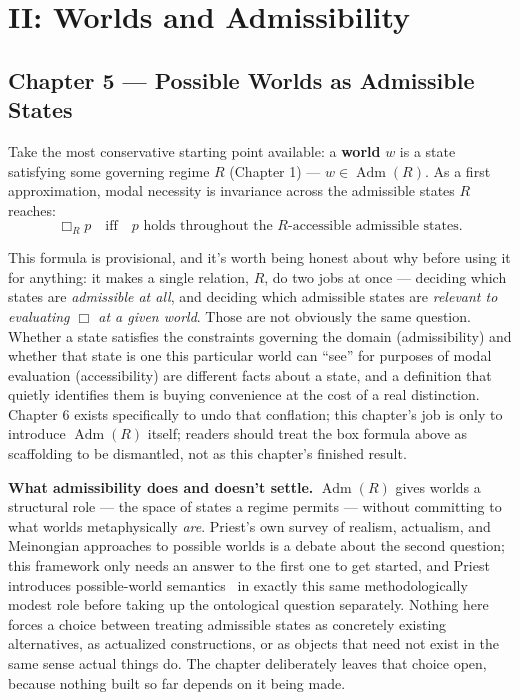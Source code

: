 \part{II: Worlds and Admissibility}\label{part-ii-worlds-and-admissibility}

\hypertarget{chapter-5-possible-worlds-as-admissible-states}{%
\chapter*{Chapter 5 --- Possible Worlds as Admissible States}
\label{chapter-5-possible-worlds-as-admissible-states}}

Take the most conservative starting point available: a \textbf{world} \(w\) is a
state satisfying some governing regime \(R\) (Chapter 1) ---
\(w \in \operatorname{Adm}(R)\). As a first approximation, modal necessity
is invariance across the admissible states \(R\) reaches:
\[\Box_R p \quad\text{iff}\quad p \text{ holds throughout the } R\text{-accessible admissible states}.\]

This formula is provisional, and it's worth being honest about why
before using it for anything: it makes a single relation, \(R\), do two
jobs at once --- deciding which states are \emph{admissible at all}, and
deciding which admissible states are \emph{relevant to evaluating \(\Box\) at a
given world}. Those are not obviously the same question. Whether a state
satisfies the constraints governing the domain (admissibility) and
whether that state is one this particular world can ``see'' for purposes
of modal evaluation (accessibility) are different facts about a state,
and a definition that quietly identifies them is buying convenience at
the cost of a real distinction. Chapter 6 exists specifically to undo
that conflation; this chapter's job is only to introduce
\(\operatorname{Adm}(R)\) itself; readers should treat the box formula
above as scaffolding to be dismantled, not as this chapter's finished
result.

\textbf{What admissibility does and doesn't settle.} \(\operatorname{Adm}(R)\)
gives worlds a structural role --- the space of states a regime permits ---
without committing to what worlds metaphysically \emph{are}. Priest's own
survey of realism, actualism, and Meinongian approaches to possible
worlds is a debate about the second question; this framework only needs
an answer to the first one to get started, and Priest introduces
possible-world semantics~\cite{priest2008} in exactly this same methodologically modest
role before taking up the ontological question separately. Nothing here
forces a choice between treating admissible states as concretely existing
alternatives, as actualized constructions, or as objects that need not
exist in the same sense actual things do. The chapter deliberately leaves
that choice open, because nothing built so far depends on it being made.


